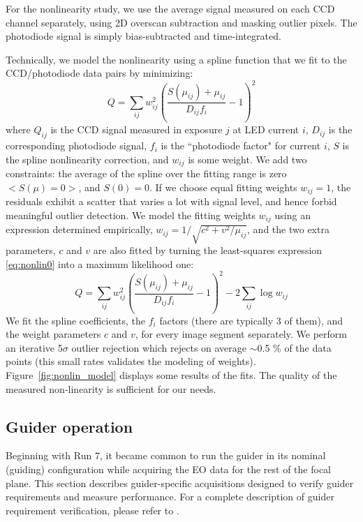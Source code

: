 For the nonlinearity study, we use the average signal measured on each CCD channel separately, using 2D overscan subtraction and masking outlier pixels. The photodiode signal is simply bias-subtracted and time-integrated. 

Technically, we model the nonlinearity using a spline function that we fit to the CCD/photodiode data pairs by minimizing:
\begin{equation}
Q = \sum_{ij} w_{ij}^2 \left( \frac{ S(\mu_{ij}) +\mu_{ij}  }{D_{ij} f_i} -1 \right)^2
\label{eq:nonlin0}
\end{equation}
where $Q_{ij}$ is the CCD signal measured in exposure $j$ at LED current $i$,
$D_{ij}$ is the corresponding photodiode signal, $f_i$ is the ``photodiode factor" for current $i$, $S$ is the spline nonlinearity correction, and $w_{ij}$ is some weight. We add two constraints: the average of the spline over the fitting range is zero $<S(\mu)=0>$, and $S(0) = 0$. If we choose equal fitting weights $w_{ij}=1$, the residuals exhibit a scatter that varies a lot with signal level, and hence forbid meaningful outlier detection. We model the fitting weights $w_{ij}$ using an expression determined empirically, $w_{ij} = 1/\sqrt{c^2+v^2/\mu_{ij}}$, and the two extra parameters, $c$ and $v$ are also fitted by turning the least-squares expression \ref{eq:nonlin0} into a maximum likelihood one:
\begin{equation}
Q = \sum_{ij} w_{ij}^2 \left( \frac{ S(\mu_{ij}) +\mu_{ij}  }{D_{ij} f_i} -1 \right)^2 - 2 \sum_{ij} \log w_{ij}
\label{eq:nonlin1}
\end{equation}
We fit the spline coefficients, the $f_i$ factors (there are typically 3 of them), and the weight parameters $c$ and $v$, for every image segment separately. We perform an iterative 5$\sigma$ outlier rejection which rejects on average $\sim $0.5 \% of the data points (this small rates validates the modeling of weights). Figure~\ref{fig:nonlin_model} displays some results of the fits. The quality of the measured non-linearity is sufficient for our needs.   

\subsection{Guider operation}\label{guider-operation}
Beginning with Run 7, it became common to run the guider in its nominal (guiding) configuration while acquiring the EO data for the rest of the focal plane. This section describes guider-specific acquisitions designed to verify guider requirements and measure performance. For a complete description of guider requirement verification, please refer to \citep{LCA-20583}.

